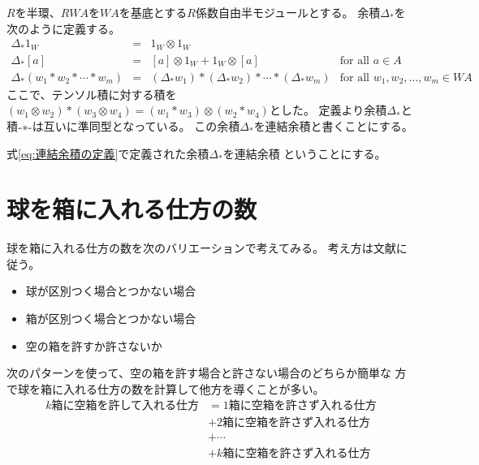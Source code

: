 	$R$を半環、$RWA$を$WA$を基底とする$R$係数自由半モジュールとする。
	余積$\Delta_*$を次のように定義する。
	\begin{equation}\label{eq:連結余積の定義}\begin{array}{rcll} %
		\Delta_*1_W &=& 1_W\otimes1_W \\
		\Delta_*[a] &=& [a]\otimes1_W+1_W\otimes[a] & \text{for all }a\in A \\
		\Delta_*(w_1*w_2*\cdots*w_m) &=& (\Delta_*w_1)*(\Delta_*w_2)*\cdots
			*(\Delta_*w_m) & \text{for all }w_1,w_2,\dots,w_m\in WA
	\end{array}\end{equation} %
	ここで、テンソル積に対する積を
	$(w_1\otimes w_2)*(w_3\otimes w_4)=(w_1*w_3)\otimes(w_2*w_4)$とした。
	定義より余積$\Delta_*$と積$\mybiop{*}$は互いに準同型となっている。
	この余積$\Delta_*$を連結余積と書くことにする。

	\begin{definition}[連結余積]\label{def:連結余積} %
		式\eqref{eq:連結余積の定義}で定義された余積$\Delta_*$を連結余積
		ということにする。
	\end{definition} %

\section{球を箱に入れる仕方の数}\label{s1:球を箱に入れる仕方の数} %
	球を箱に入れる仕方の数を次のバリエーションで考えてみる。
	考え方は文献\cite{html:iga.math}に従う。
	\begin{itemize}\setlength{\itemsep}{-1mm} %
		\item 球が区別つく場合とつかない場合
		\item 箱が区別つく場合とつかない場合
		\item 空の箱を許すか許さないか
	\end{itemize} %
	次のパターンを使って、空の箱を許す場合と許さない場合のどちらか簡単な
	方で球を箱に入れる仕方の数を計算して他方を導くことが多い。
	\begin{equation}\label{eq:空箱ありは空箱なしの直和}\begin{split} %
		k\text{箱に空箱を許して入れる仕方} 
		&= 1\text{箱に空箱を許さず入れる仕方} \\
		&+ 2\text{箱に空箱を許さず入れる仕方} \\
		&+ \cdots \\
		&+ k\text{箱に空箱を許さず入れる仕方}
	\end{split}\end{equation} %
